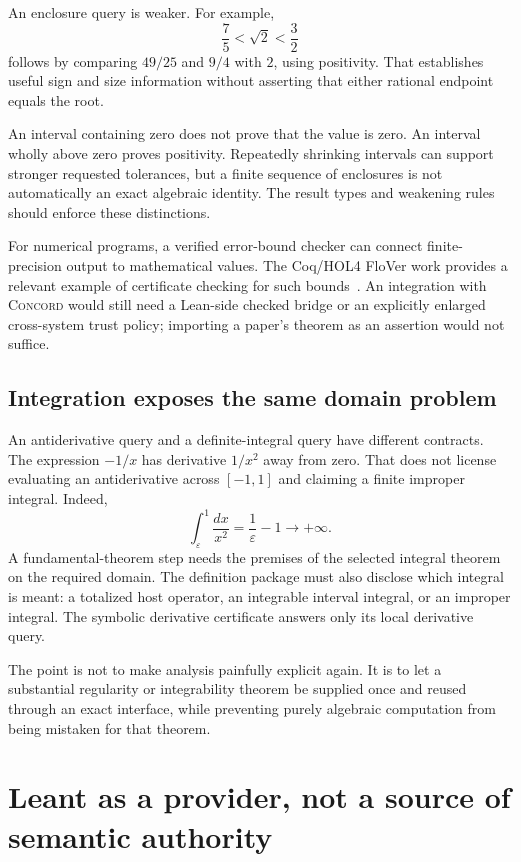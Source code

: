 \documentclass[11pt,a4paper]{article}
\newcommand{\Concord}{\textsc{Concord}}
\theoremstyle{definition}
\begin{document}
An enclosure query is weaker. For example,
\[
              \frac75<\sqrt2<\frac32
\]
follows by comparing \(49/25\) and \(9/4\) with \(2\), using positivity. That establishes useful sign and size information without asserting that either rational endpoint equals the root.

An interval containing zero does not prove that the value is zero. An interval wholly above zero proves positivity. Repeatedly shrinking intervals can support stronger requested tolerances, but a finite sequence of enclosures is not automatically an exact algebraic identity. The result types and weakening rules should enforce these distinctions.

For numerical programs, a verified error-bound checker can connect finite-precision output to mathematical values. The Coq/HOL4 FloVer work provides a relevant example of certificate checking for such bounds~\cite{flover}. An integration with \Concord{} would still need a Lean-side checked bridge or an explicitly enlarged cross-system trust policy; importing a paper's theorem as an assertion would not suffice.

\subsection{Integration exposes the same domain problem}
An antiderivative query and a definite-integral query have different contracts. The expression \(-1/x\) has derivative \(1/x^2\) away from zero. That does not license evaluating an antiderivative across \([-1,1]\) and claiming a finite improper integral. Indeed,
\[
       \int_\varepsilon^1\frac{dx}{x^2}=\frac1\varepsilon-1
          \longrightarrow+\infty.
\]
A fundamental-theorem step needs the premises of the selected integral theorem on the required domain. The definition package must also disclose which integral is meant: a totalized host operator, an integrable interval integral, or an improper integral. The symbolic derivative certificate answers only its local derivative query.

The point is not to make analysis painfully explicit again. It is to let a substantial regularity or integrability theorem be supplied once and reused through an exact interface, while preventing purely algebraic computation from being mistaken for that theorem.

\section{Leant as a provider, not a source of semantic authority}\label{sec:leant}
\end{document}
